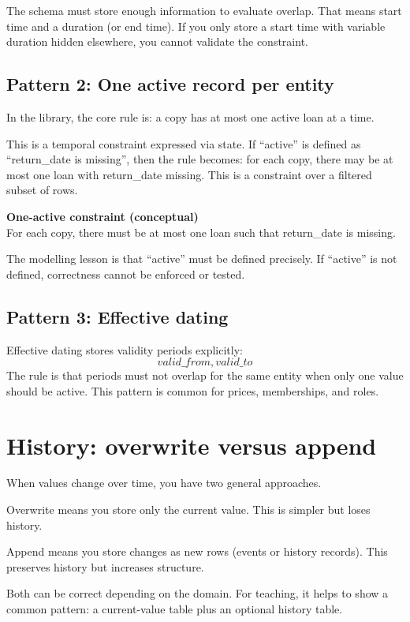 The schema must store enough information to evaluate overlap.
That means start time and a duration (or end time).
If you only store a start time with variable duration hidden elsewhere, you cannot validate the constraint.

\subsection{Pattern 2: One active record per entity}
In the library, the core rule is:
a copy has at most one active loan at a time.

This is a temporal constraint expressed via state.
If “active” is defined as “return\_date is missing”, then the rule becomes:
for each copy, there may be at most one loan with return\_date missing.
This is a constraint over a filtered subset of rows.

\begin{examplebox}
\textbf{One-active constraint (conceptual)}\\
For each copy, there must be at most one loan such that return\_date is missing.
\end{examplebox}

The modelling lesson is that “active” must be defined precisely.
If “active” is not defined, correctness cannot be enforced or tested.

\subsection{Pattern 3: Effective dating}
Effective dating stores validity periods explicitly:
\[
valid\_from, valid\_to
\]
The rule is that periods must not overlap for the same entity when only one value should be active.
This pattern is common for prices, memberships, and roles.

\section{History: overwrite versus append}
When values change over time, you have two general approaches.

Overwrite means you store only the current value.
This is simpler but loses history.

Append means you store changes as new rows (events or history records).
This preserves history but increases structure.

Both can be correct depending on the domain.
For teaching, it helps to show a common pattern:
a current-value table plus an optional history table.

